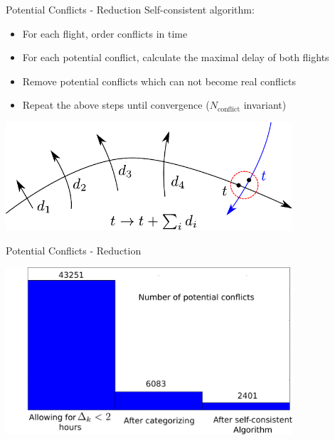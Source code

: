 \documentclass[10pt]{beamer}
\begin{document}
\begin{frame}[t]{Potential Conflicts - Reduction}
    Self-consistent algorithm:
    \begin{itemize}
        \item For each flight, order conflicts in time
        \item For each potential conflict, calculate the maximal delay of both flights
        \item Remove potential conflicts which can not become real conflicts
        \item Repeat the above steps until convergence ($N_\text{conflict}$ invariant) 
    \end{itemize}
    \begin{center}
        \includegraphics[width=0.8\textwidth]{images/potential_conflict_detection.pdf}
    \end{center}
\end{frame}
\begin{frame}[t]{Potential Conflicts - Reduction}
    \begin{center}
        \hspace{-1.5cm}
        \includegraphics[width=0.8\textwidth]{images/potential_conflict_reduction.pdf}
    \end{center}
\end{frame}
\end{document}
